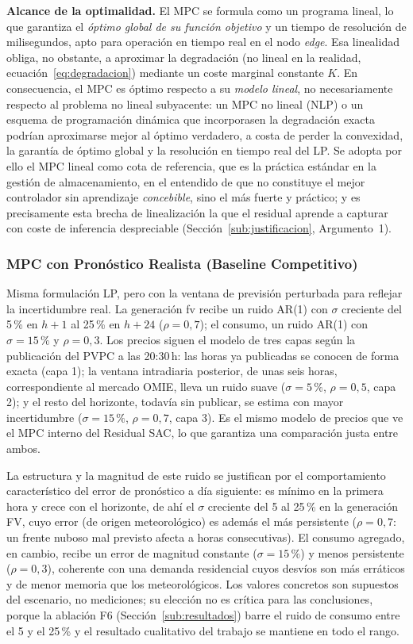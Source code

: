 \documentclass[12pt, a4paper, twoside]{report}
\begin{document}
\textbf{Alcance de la optimalidad.} El MPC se formula como un programa lineal, lo
que garantiza el \emph{óptimo global de su función objetivo} y un tiempo de
resolución de milisegundos, apto para operación en tiempo real en el nodo
\textit{edge}. Esa linealidad obliga, no obstante, a aproximar la degradación
(no lineal en la realidad, ecuación~\eqref{eq:degradacion}) mediante un coste
marginal constante $K$. En consecuencia, el MPC es óptimo respecto a su
\emph{modelo lineal}, no necesariamente respecto al problema no lineal subyacente:
un MPC no lineal (NLP) o un esquema de programación dinámica que incorporasen la
degradación exacta podrían aproximarse mejor al óptimo verdadero, a costa de
perder la convexidad, la garantía de óptimo global y la resolución en tiempo real
del LP. Se adopta por ello el MPC lineal como cota de referencia, que es la práctica
estándar en la gestión de almacenamiento, en el entendido de que no constituye
el mejor controlador sin aprendizaje \emph{concebible}, sino el más fuerte y
práctico; y es precisamente esta brecha de linealización la que el residual
aprende a capturar con coste de inferencia despreciable (Sección~\ref{sub:justificacion},
Argumento~1).

\subsubsection{MPC con Pronóstico Realista (Baseline Competitivo)}

Misma formulación LP, pero con la ventana de previsión perturbada para reflejar
la incertidumbre real. La generación \acrshort{fv} recibe un ruido AR(1) con
$\sigma$ creciente del 5\,\% en $h{+}1$ al 25\,\% en $h{+}24$ ($\rho=0{,}7$); el
consumo, un ruido AR(1) con $\sigma=15\,\%$ y $\rho=0{,}3$. Los precios siguen
el modelo de tres capas según la publicación del PVPC a las 20:30\,h: las horas
ya publicadas se conocen de forma exacta (capa 1); la ventana intradiaria
posterior, de unas seis horas, correspondiente al mercado OMIE, lleva un ruido
suave ($\sigma=5\,\%$, $\rho=0{,}5$, capa 2); y el resto del horizonte, todavía
sin publicar, se estima con mayor incertidumbre ($\sigma=15\,\%$, $\rho=0{,}7$,
capa 3). Es el mismo modelo de precios que ve el MPC interno del Residual SAC,
lo que garantiza una comparación justa entre ambos.

La estructura y la magnitud de este ruido se justifican por el comportamiento
característico del error de pronóstico a día siguiente: es mínimo en la
primera hora y crece con el horizonte, de ahí el $\sigma$ creciente del 5 al
25\,\% en la generación FV, cuyo error (de origen meteorológico) es además el
más persistente ($\rho=0{,}7$: un frente nuboso mal previsto afecta a horas
consecutivas). El consumo agregado, en cambio, recibe un error de magnitud
constante ($\sigma=15\,\%$) y menos persistente ($\rho=0{,}3$), coherente con
una demanda residencial cuyos desvíos son más erráticos y de menor memoria que
los meteorológicos. Los valores concretos son supuestos del escenario, no
mediciones; su elección no es crítica para las conclusiones, porque la
ablación F6 (Sección~\ref{sub:resultados}) barre el ruido de consumo entre el
5 y el 25\,\% y el resultado cualitativo del trabajo se mantiene en todo el
rango.
\end{document}
